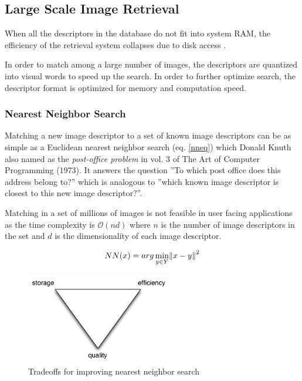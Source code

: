 \documentclass[english,12pt,a4paper,pdftex,elec,utf8, table]{aaltothesis}
\begin{document}
\subsection{Large Scale Image Retrieval}

When all the descriptors in the database do not fit into system RAM, the efficiency of the retrieval system collapses due to disk access \cite{Philbin2007}.

In order to match among a large number of images, the descriptors are quantized into visual words to speed up the search. In order to further optimize search, the descriptor format is optimized for memory and computation speed. \cite{Jegou2010}

\subsubsection{Nearest Neighbor Search}
Matching a new image descriptor to a set of known image descriptors can be as simple as a Euclidean nearest neighbor search (eq. \ref{nneq}) which Donald Knuth also named as the \emph{post-office problem} in vol. 3 of The Art of Computer Programming (1973). It answers the question ''To which post office does this address belong to?'' which is analogous to ''which known image descriptor is closest to this new image descriptor?''.

Matching in a set of millions of images is not feasible in user facing applications as the time complexity is $\mathcal{O}(nd)$ where $n$ is the number of image descriptors in the set and $d$ is the dimensionality of each image descriptor.


\begin{equation}
\label{nneq}
NN(x) = arg \min_{y\in Y}\norm{x-y}^2
\end{equation}

\begin{figure}[htb]
\begin{center}
\includegraphics[height=4cm]{figures/nntradeoffs}
\end{center}
\caption{Tradeoffs for improving nearest neighbor search}
\label{nntradeoffs}
\end{figure}
\end{document}
